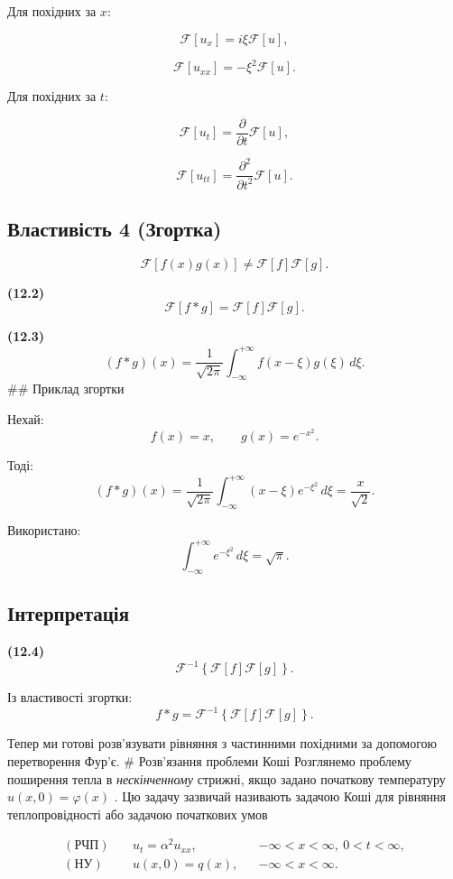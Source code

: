 \documentclass[
  ukrainian,
]{article}
\begin{document}
Для похідних за \(x\):

\[
\mathcal{F}[u_x] = i\xi \mathcal{F}[u],
\]

\[
\mathcal{F}[u_{xx}] = -\xi^2 \mathcal{F}[u].
\]

Для похідних за \(t\):

\[
\mathcal{F}[u_t] = \frac{\partial}{\partial t}\mathcal{F}[u],
\]

\[
\mathcal{F}[u_{tt}] = \frac{\partial^2}{\partial t^2}\mathcal{F}[u].
\]

\subsection{Властивість 4
(Згортка)}\label{ux432ux43bux430ux441ux442ux438ux432ux456ux441ux442ux44c-4-ux437ux433ux43eux440ux442ux43aux430}

\[
\mathcal{F}[f(x)g(x)] \neq \mathcal{F}[f]\mathcal{F}[g].
\]

\textbf{(12.2)} \[
\mathcal{F}[f*g] = \mathcal{F}[f]\mathcal{F}[g].
\]

\textbf{(12.3)} \[
(f*g)(x) = \frac{1}{\sqrt{2\pi}} \int_{-\infty}^{+\infty} f(x-\xi)g(\xi)\,d\xi.
\] \#\# Приклад згортки

Нехай: \[
f(x) = x, \qquad g(x) = e^{-x^2}.
\]

Тоді: \[
(f*g)(x) = \frac{1}{\sqrt{2\pi}} \int_{-\infty}^{+\infty} (x-\xi)e^{-\xi^2}\,d\xi = \frac{x}{\sqrt{2}}.
\]

Використано: \[
\int_{-\infty}^{+\infty} e^{-\xi^2}\,d\xi = \sqrt{\pi}.
\]

\subsection{Інтерпретація}\label{ux456ux43dux442ux435ux440ux43fux440ux435ux442ux430ux446ux456ux44f}

\textbf{(12.4)} \[
\mathcal{F}^{-1}\left\{\mathcal{F}[f]\mathcal{F}[g]\right\}.
\]

Із властивості згортки: \[
f * g = \mathcal{F}^{-1}\left\{\mathcal{F}[f]\mathcal{F}[g]\right\}.
\]

Тепер ми готові розв'язувати рівняння з частинними похідними за
допомогою перетворення Фур'є. \# Розв'язання проблеми Коші Розглянемо
проблему поширення тепла в \emph{нескінченному} стрижні, якщо задано
початкову температуру \(u(x, 0) = \varphi(x)\) . Цю задачу зазвичай
називають задачою Коші для рівняння теплопровідності або задачою
початкових умов

\[
\begin{aligned}
(\text{РЧП})\quad & u_t=\alpha^2u_{xx}, && -\infty<x<\infty,\ 0<t<\infty,\\
(\text{НУ})\quad & u(x,0)=q(x), && -\infty<x<\infty.
\end{aligned}
\]
\end{document}
